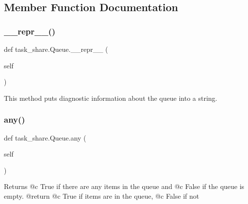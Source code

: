 \subsection{Member Function Documentation}
\mbox{\label{classtask__share_1_1Queue_a94d0801557844c8f7dcb772ca768a1a4}} 
\subsubsection{\texorpdfstring{\+\_\+\+\_\+repr\+\_\+\+\_\+()}{\_\_repr\_\_()}}
{\footnotesize\ttfamily def task\+\_\+share.\+Queue.\+\_\+\+\_\+repr\+\_\+\+\_\+ (\begin{DoxyParamCaption}\item[{}]{self }\end{DoxyParamCaption})}

\begin{DoxyVerb}This method puts diagnostic information about the queue into a 
string. \end{DoxyVerb}
 \mbox{\label{classtask__share_1_1Queue_a7cb2d23978b90a232cf9cea4cc0ccb6b}} 
\subsubsection{\texorpdfstring{any()}{any()}}
{\footnotesize\ttfamily def task\+\_\+share.\+Queue.\+any (\begin{DoxyParamCaption}\item[{}]{self }\end{DoxyParamCaption})}

\begin{DoxyVerb}Returns @c True if there are any items in the queue and @c False
if the queue is empty.
@return @c True if items are in the queue, @c False if not \end{DoxyVerb}
 \mbox{\label{classtask__share_1_1Queue_af9ada059fc09a44adc9084901e2f7266}} 
